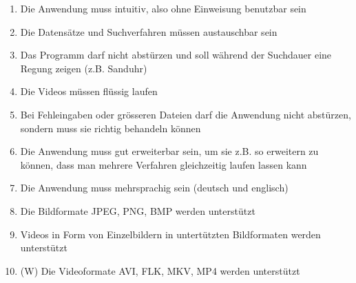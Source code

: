 \begin{enumerate}[label=\bfseries /NF \arabic*0/]
  \item Die Anwendung muss intuitiv, also ohne Einweisung benutzbar sein
  \item Die Datensätze und Suchverfahren müssen austauschbar sein
  \item Das Programm darf nicht abstürzen und soll während der Suchdauer eine Regung zeigen (z.B. Sanduhr)
  \item Die Videos müssen flüssig laufen
  \item Bei Fehleingaben oder grösseren Dateien darf die Anwendung nicht abstürzen, sondern muss sie richtig behandeln können
  \item Die Anwendung muss gut erweiterbar sein, um sie z.B. so erweitern zu können, dass man mehrere Verfahren gleichzeitig laufen lassen kann
  \item Die Anwendung muss mehrsprachig sein (deutsch und englisch)
	\item Die Bildformate JPEG, PNG, BMP werden unterst\"utzt
	\item Videos in Form von Einzelbildern in untert\"utzten Bildformaten werden unterst\"utzt
	\item (W) Die Videoformate AVI, FLK, MKV, MP4 werden unterst\"utzt
\end{enumerate}
